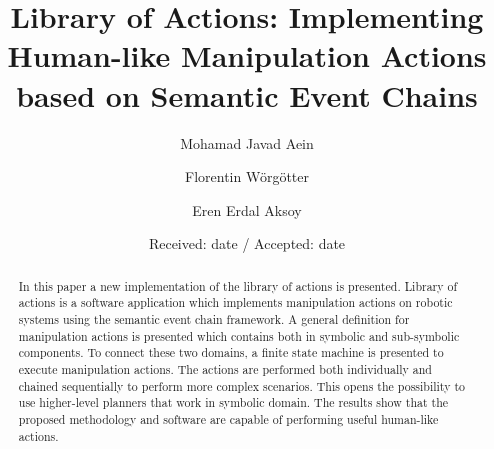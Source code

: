 \title{Library of Actions: Implementing Human-like Manipulation Actions based on Semantic Event Chains}




\author{  Mohamad Javad Aein      \and  	 Florentin  W\"org\"otter	 \and  Eren Erdal Aksoy  	 }



\date{Received: date / Accepted: date}

\maketitle

\begin{abstract}

In this paper a new implementation of the library of actions is presented.
Library of actions is a software application which implements  manipulation actions on robotic systems using the semantic event chain framework.
A general definition for manipulation actions is presented which contains both in symbolic and sub-symbolic components.
To connect these two domains, a finite state machine is presented to execute manipulation actions.
The actions are performed both individually and chained sequentially to perform more complex scenarios.
This opens the possibility to use higher-level planners that work in symbolic domain.
The results show that the proposed methodology and software are capable of performing useful human-like actions.


 
\end{abstract}


